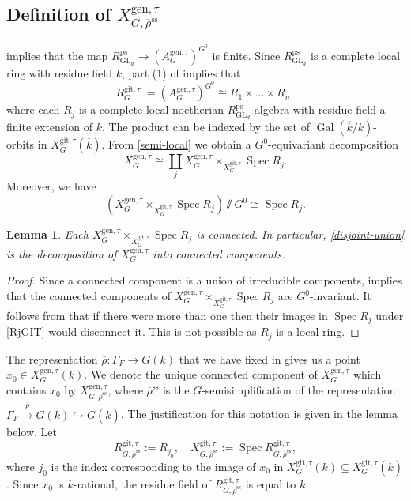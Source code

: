 \documentclass{amsart}
\newtheorem{lem}[prop]{Lemma}
\theoremstyle{definition}
\theoremstyle{remark}
\DeclareMathOperator{\GL}{GL}
\DeclareMathOperator{\Gal}{Gal}
\DeclareMathOperator{\Spec}{Spec}
\newcommand{\rhobar}{\overline{\rho}}
\newcommand{\ps}{\mathrm{ps}}
\newcommand{\gen}{\mathrm{gen}}
\newcommand{\gps}{\mathrm{git}}
\newcommand{\RpsGLd}{R^{\ps}_{\GL_d}}
\newcommand{\XgenGtau}{X^{\gen, \tau}_G}
\newcommand{\XgpsGtau}{X^{\gps, \tau}_{G}}
\newcommand{\kbar}{\overline{k}}
\newcommand{\rhobarss}{\rhobar^{\mathrm{ss}}}
\newcommand{\AgenGtau}{A^{\gen, \tau}_G}
\begin{document}
\subsection{\texorpdfstring{Definition of $X^{\gen, \tau}_{G, \rhobarss}$}{Definition of XgentauGrhobarss}}
\label{sec_def_XgenGtaurhobarss}

 implies that the map $\RpsGLd\rightarrow (\AgenGtau)^{G^0}$ is finite. Since $\RpsGLd$ is a complete local ring with residue 
field $k$, part (1) of  \cite[\href{https://stacks.math.columbia.edu/tag/04GH}{Tag 04GH}]{stacks-project}  implies that 
\begin{equation}\label{semi-local}
R^{\gps,\tau}_G:=(A^{\gen, \tau}_G)^{G^0}\cong R_1\times \ldots \times R_n,
\end{equation}
where each $R_j$ is a complete local noetherian $\RpsGLd$-algebra with residue field a finite extension of 
$k$. The product can be indexed by the set of $\Gal(\kbar/k)$-orbits in $X^{\gps,\tau}_G(\kbar)$. 
From  \eqref{semi-local} we obtain a $G^0$-equivariant decomposition 
\begin{equation}\label{disjoint-union}
\XgenGtau\cong \coprod_j \XgenGtau\times_{\XgpsGtau} \Spec R_j.
\end{equation}
Moreover, we have  
\begin{equation}\label{RjGIT}
(\XgenGtau\times_{\XgpsGtau} \Spec R_j)\sslash G^0 \cong \Spec R_j.
\end{equation}

\begin{lem}\label{connected_comp} Each $\XgenGtau\times_{\XgpsGtau} \Spec R_j$ is connected. In particular, 
\eqref{disjoint-union} is the decomposition of $\XgenGtau$ into connected components. 
\end{lem}
\begin{proof} Since a connected component is a union of irreducible 
components, \cite[Lemma 2.1]{BIP_new} implies that the connected components of $\XgenGtau\times_{\XgpsGtau} \Spec R_j$ are $G^0$-invariant. It follows from \cite[Theorem 3 (iii)]{seshadri} 
that if there were more than one then their images in $\Spec R_j$ under \eqref{RjGIT}
would disconnect it.  This is not possible as $R_j$ is  a local ring.
\end{proof}


The representation $\rhobar: \Gamma_F\rightarrow G(k)$ that we have fixed in 
 gives us a point $x_0\in X^{\gen, \tau}_G(k)$. We denote the unique
connected component of $X^{\gen,\tau}_G$ which contains $x_0$ by $X^{\gen, \tau}_{G, \rhobarss}$, 
where $\rhobarss$ is the $G$-semisimplification of the representation
$\Gamma_F \overset{\rhobar}{\longrightarrow} G(k) \hookrightarrow G(\kbar)$. The justification for this 
notation is given in the lemma below. Let 
$$ R^{\gps, \tau}_{G, \rhobarss}:= R_{j_0}, \quad X^{\gps, \tau}_{G, \rhobarss}:= \Spec R^{\gps, \tau}_{G, \rhobarss},$$
where $j_0$ is the index corresponding to the image of 
$x_0$ in $X^{\gps, \tau}_G(k)\subseteq X^{\gps, \tau}_G(\kbar)$.  Since 
$x_0$ is $k$-rational, the residue field of $R^{\gps, \tau}_{G, \rhobarss}$ is equal to $k$. 
\end{document}
